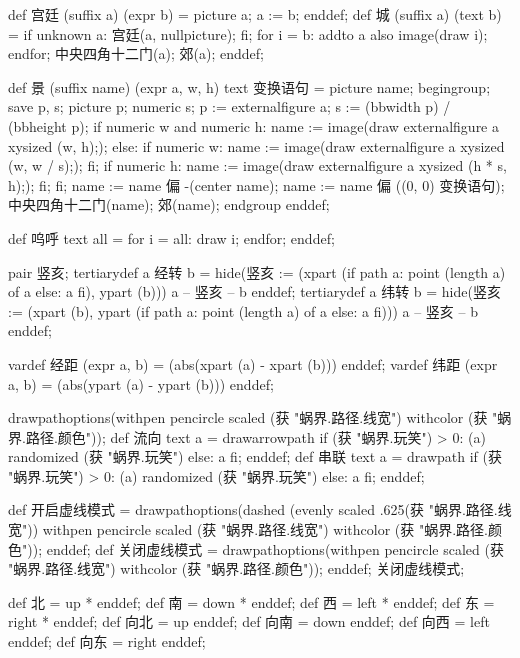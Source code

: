 \startMPinclusions[+]
def 宫廷 (suffix a) (expr b) = picture a; a := b; enddef;
def 城 (suffix a) (text b) =
  if unknown a:
    宫廷(a, nullpicture);
  fi;
  for i = b: addto a also image(draw i); endfor;
  中央四角十二门(a); 郊(a);
enddef;
\stopMPinclusions

\startMPinclusions[+]
def 景 (suffix name) (expr a, w, h) text 变换语句 =
  picture name;
  begingroup;
  save p, s; picture p; numeric s;
  p := externalfigure a;
  s := (bbwidth p) / (bbheight p);
  if numeric w and numeric h:
    name := image(draw externalfigure a xysized (w, h););
  else:
    if numeric w:
      name := image(draw externalfigure a xysized (w, w / s););
    fi;
    if numeric h:
       name := image(draw externalfigure a xysized (h * s, h););
    fi;
  fi;
  name := name 偏 -(center name); %
  name := name 偏 ((0, 0) 变换语句); 
  中央四角十二门(name); 郊(name);
  endgroup
enddef;

def 呜呼 text all =
  for i = all: draw i; endfor;
enddef;
\stopMPinclusions

\startMPinclusions[+]
pair 竖亥;
tertiarydef a 经转 b =
  hide(竖亥 := (xpart (if path a: point (length a) of a else: a fi), ypart (b)))
  a -- 竖亥 -- b
enddef;
tertiarydef a 纬转 b =
  hide(竖亥 := (xpart (b), ypart (if path a: point (length a) of a else: a fi)))
  a --  竖亥 -- b
enddef;
\stopMPinclusions

\startMPinclusions[+]
vardef 经距 (expr a, b) = (abs(xpart (a) - xpart (b))) enddef;
vardef 纬距 (expr a, b) = (abs(ypart (a) - ypart (b))) enddef;
\stopMPinclusions

\startMPinclusions[+]
drawpathoptions(withpen pencircle scaled (获 "蜗界.路径.线宽") withcolor (获 "蜗界.路径.颜色"));
def 流向 text a =
  drawarrowpath if (获 "蜗界.玩笑") > 0: (a) randomized (获 "蜗界.玩笑") else: a fi;
enddef;
def 串联 text a =
  drawpath if (获 "蜗界.玩笑") > 0: (a) randomized (获 "蜗界.玩笑") else: a fi;  
enddef;
\stopMPinclusions

\startMPinclusions[+]
def 开启虚线模式 =
  drawpathoptions(dashed (evenly scaled .625(获 "蜗界.路径.线宽"))
                  withpen pencircle scaled (获 "蜗界.路径.线宽")
                  withcolor (获 "蜗界.路径.颜色"));
enddef;
def 关闭虚线模式 =
  drawpathoptions(withpen pencircle scaled (获 "蜗界.路径.线宽")
                  withcolor (获 "蜗界.路径.颜色"));
enddef;
关闭虚线模式;
\stopMPinclusions

\startMPinclusions[+]
def 北 = up * enddef; 
def 南 = down * enddef;
def 西 = left * enddef; 
def 东 = right * enddef;
def 向北 = up enddef; 
def 向南 = down enddef;
def 向西 = left enddef; 
def 向东 = right enddef;

